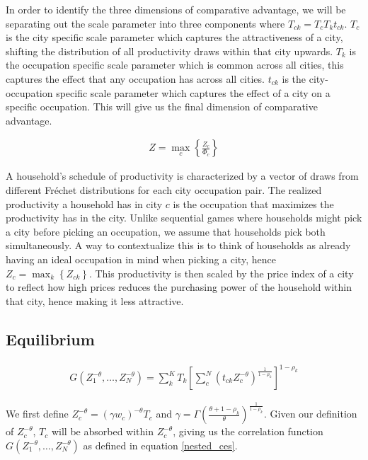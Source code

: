 \documentclass[10pt]{article}
\begin{document}
In order to identify the three dimensions of comparative advantage, we will be separating out the scale parameter into three components where $T_{ck} = T_c T_k t_{ck}$. $T_c$ is the city specific scale parameter which captures the attractiveness of a city, shifting the distribution of all productivity draws within that city upwards. $T_k$ is the occupation specific scale parameter which is common across all cities, this captures the effect that any occupation has across all cities. $t_{ck}$ is the city-occupation specific scale parameter which captures the effect of a city on a specific occupation. This will give us the final dimension of comparative advantage.

\begin{align}
    Z = \max_c \left\{ \frac{Z_c}{\Phi_c} \right\}
\end{align}

A household's schedule of productivity is characterized by a vector of draws from different Fr\'{e}chet distributions for each city occupation pair. The realized productivity a household has in city $c$ is the occupation that maximizes the productivity has in the city. Unlike sequential games where households might pick a city before picking an occupation, we assume that households pick both simultaneously. A way to contextualize this is to think of households as already having an ideal occupation in mind when picking a city, hence $Z_c = \max_k \left\{ Z_{ck} \right\}$. This productivity is then scaled by the price index of a city to reflect how high prices reduces the purchasing power of the household within that city, hence making it less attractive.

\subsection{Equilibrium}

\begin{align}
    G(Z_1^{- \theta}, \dots, Z_N^{- \theta}) = \sum_{k}^{K} T_k \left[ \sum_{c}^{N} (t_{ck} Z_c^{- \theta})^{\frac{1}{1 - \rho_k}} \right]^{1 - \rho_k}
    \label{nested_ces}
\end{align}

We first define $Z_c^{- \theta} = (\gamma w_c)^{- \theta} T_c$ and $\gamma = \Gamma (\frac{\theta + 1 - \rho_k}{\theta})^{\frac{1}{1 - \rho_k}}$. Given our definition of $Z_c^{- \theta}$, $T_c$ will be absorbed within $Z_c^{- \theta}$, giving us the correlation function $G(Z_1^{- \theta}, \dots, Z_N^{- \theta})$ as defined in equation \ref{nested_ces}.
\end{document}
